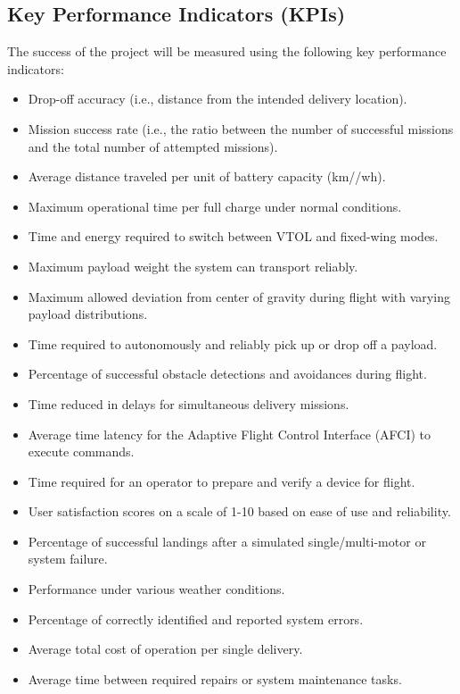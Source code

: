 \documentclass[12pt]{article}
\begin{document}
\subsection{Key Performance Indicators (KPIs)}
The success of the project will be measured using the following key performance indicators:
\begin{itemize}
    \item Drop-off accuracy (i.e., distance from the intended delivery location).
    \item Mission success rate (i.e., the ratio between the number of successful missions and the total number of attempted missions).
    \item Average distance traveled per unit of battery capacity (km//wh).
    \item Maximum operational time per full charge under normal conditions.
    \item Time and energy required to switch between VTOL and fixed-wing modes.
    \item Maximum payload weight the system can transport reliably.
    \item Maximum allowed deviation from center of gravity during flight with varying payload distributions.
    \item Time required to autonomously and reliably pick up or drop off a payload.
    \item Percentage of successful obstacle detections and avoidances during flight.
    \item Time reduced in delays for simultaneous delivery missions.
    \item Average time latency for the Adaptive Flight Control Interface (AFCI) to execute commands.
    \item Time required for an operator to prepare and verify a device for flight.
    \item User satisfaction scores on a scale of 1-10 based on ease of use and reliability.
    \item Percentage of successful landings after a simulated single/multi-motor or system failure.
    \item Performance under various weather conditions.
    \item Percentage of correctly identified and reported system errors.
    \item Average total cost of operation per single delivery.
    \item Average time between required repairs or system maintenance tasks.
\end{itemize}
\end{document}

